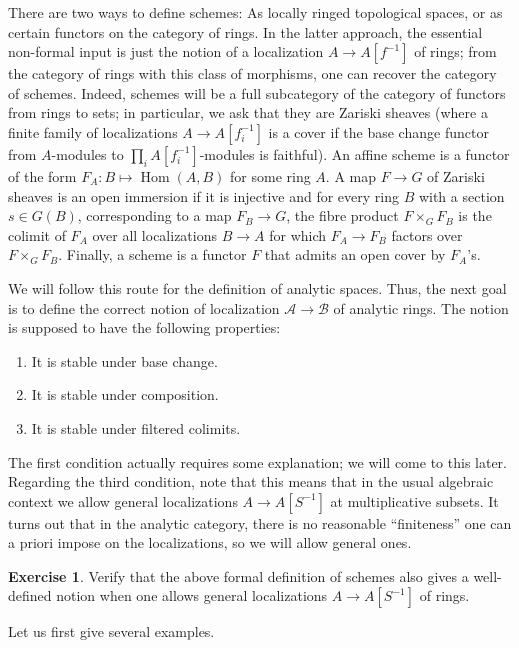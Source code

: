 \documentclass[11pt]{amsbook}
\DeclareMathOperator{\Hom}{Hom}
\numberwithin{equation}{section}
\numberwithin{theorem}{section}
\theoremstyle{definition}
\newtheorem{exercise}[theorem]{Exercise}
\begin{document}
There are two ways to define schemes: As locally ringed topological spaces, or as certain functors on the category of rings. In the latter approach, the essential non-formal input is just the notion of a localization $A\to A[f^{-1}]$ of rings; from the category of rings with this class of morphisms, one can recover the category of schemes. Indeed, schemes will be a full subcategory of the category of functors from rings to sets; in particular, we ask that they are Zariski sheaves (where a finite family of localizations $A\to A[f_i^{-1}]$ is a cover if the base change functor from $A$-modules to $\prod_i A[f_i^{-1}]$-modules is faithful). An affine scheme is a functor of the form $F_A: B\mapsto \Hom(A,B)$ for some ring $A$. A map $F\to G$ of Zariski sheaves is an open immersion if it is injective and for every ring $B$ with a section $s\in G(B)$, corresponding to a map $F_B\to G$, the fibre product $F\times_G F_B$ is the colimit of $F_A$ over all localizations $B\to A$ for which $F_A\to F_B$ factors over $F\times_G F_B$. Finally, a scheme is a functor $F$ that admits an open cover by $F_A$'s.

We will follow this route for the definition of analytic spaces. Thus, the next goal is to define the correct notion of localization $\mathcal A\to \mathcal B$ of analytic rings. The notion is supposed to have the following properties:
\begin{enumerate}
\item It is stable under base change.
\item It is stable under composition.
\item It is stable under filtered colimits.
\end{enumerate}
The first condition actually requires some explanation; we will come to this later. Regarding the third condition, note that this means that in the usual algebraic context we allow general localizations $A\to A[S^{-1}]$ at multiplicative subsets. It turns out that in the analytic category, there is no reasonable ``finiteness'' one can a priori impose on the localizations, so we will allow general ones.

\begin{exercise} Verify that the above formal definition of schemes also gives a well-defined notion when one allows general localizations $A\to A[S^{-1}]$ of rings.
\end{exercise}

Let us first give several examples.
\end{document}
